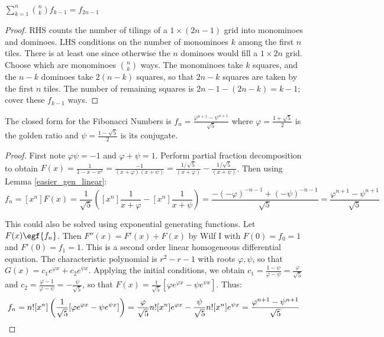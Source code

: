 \documentclass[a4paper]{article}
\begin{document}
\begin{lemma}
$\displaystyle\sum_{k=1}^n\binom nkf_{k-1}=f_{2n-1}$

\begin{hl}
\begin{proof}
RHS counts the number of tilings of a $1\times(2n-1)$ grid into monominoes and dominoes. LHS conditions on the number of monominoes $k$ among the first $n$ tiles. There is at least one since otherwise the $n$ dominoes would fill a $1\times 2n$ grid. Choose which are monominoes $\binom nk$ ways. The monominoes take $k$ squares, and the $n-k$ dominoes take $2(n-k)$ squares, so that $2n-k$ squares are taken by the first $n$ tiles. The number of remaining squares is $2n-1-(2n-k)=k-1$; cover these $f_{k-1}$ ways.
\end{proof}
\end{hl}
\end{lemma}

\begin{lemma}
The closed form for the Fibonacci Numbers is $\displaystyle f_n=\frac{\varphi^{n+1}-\psi^{n+1}}{\sqrt5}$ where $\varphi=\frac{1+\sqrt5}2$ is the golden ratio and $\psi=\frac{1-\sqrt5}2$ is its conjugate.

\begin{hl}
\begin{proof}
First note $\varphi\psi=-1$ and $\varphi+\psi=1$. Perform partial fraction decomposition to obtain $F(x)=\frac1{1-x-x^2}=\frac{-1}{(x+\varphi)(x+\psi)}=\frac{1/\sqrt5}{(x+\varphi)}-\frac{1/\sqrt5}{(x+\psi)}$. Then using Lemma \ref{easier_gen_linear}:
\begin{equation*}
f_n
=[x^n]F(x)
=\frac1{\sqrt5}\left([x^n]\frac{1}{x+\varphi}-[x^n]\frac{1}{x+\psi}\right)
=\frac{-(-\varphi)^{-n-1}+(-\psi)^{-n-1}}{\sqrt5}
=\frac{\varphi^{n+1}-\psi^{n+1}}{\sqrt5}
\end{equation*}

This could also be solved using exponential generating functions. Let $F(x)\egf\{f_n\}$. Then $F''(x)=F'(x)+F(x)$ by Wilf I with $F(0)=f_0=1$ and $F'(0)=f_1=1$. This is a second order linear homogeneous differential equation. The characteristic polynomial is $r^2-r-1$ with roots $\varphi,\psi$, so that $G(x)=c_1e^{\varphi x}+c_2e^{\psi x}$. Applying the initial conditions, we obtain $c_1=\frac{1-\psi}{\varphi-\psi}=\frac{\varphi}{\sqrt 5}$ and $c_2=\frac{\varphi-1}{\varphi-\psi}=-\frac{\psi}{\sqrt5}$, so that $F(x)=\frac1{\sqrt5}[\varphi e^{\varphi x}-\psi e^{\psi x}]$. Thus:
\begin{equation*}
f_n
=n![x^n]\left(\frac1{\sqrt5}[\varphi e^{\varphi x}-\psi e^{\psi x}]\right)
=\frac{\varphi}{\sqrt5} n![x^n]e^{\varphi x}-\frac{\psi}{\sqrt5} n![x^n]e^{\psi x}
=\frac{\varphi^{n+1}-\psi^{n+1}}{\sqrt5}\qedhere
\end{equation*}
\end{proof}
\end{hl}
\end{lemma}
\end{document}
